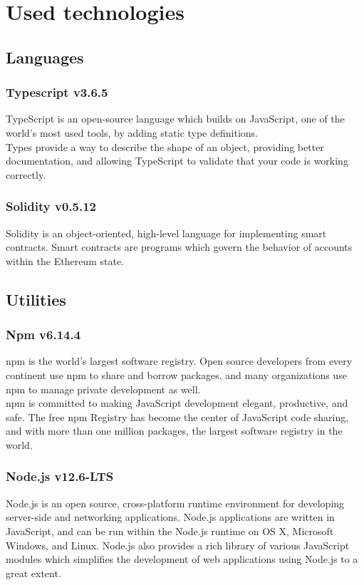 \section{Used technologies}

\subsection{Languages}
\subsubsection*{Typescript v3.6.5}
TypeScript is an open-source language which builds on JavaScript, one of the world’s most used tools, by adding static type definitions.\\
Types provide a way to describe the shape of an object, providing better documentation, and allowing TypeScript to validate that your code is working correctly.

\subsubsection*{Solidity v0.5.12}
Solidity is an object-oriented, high-level language for implementing smart contracts.
Smart contracts are programs which govern the behavior of accounts within the Ethereum state.

\subsection{Utilities}

\subsubsection*{Npm v6.14.4}
npm is the world’s largest software registry. Open source developers from every continent use npm to share and borrow packages, and many organizations use npm to manage private development as well.\\
npm is committed to making JavaScript development elegant, productive, and safe. The free npm Registry has become the center of JavaScript code sharing, and with more than one million packages, the largest software registry in the world. 

\subsubsection*{Node.js v12.6-LTS}
Node.js is an open source, cross-platform runtime environment for developing server-side and networking applications. 
Node.js applications are written in JavaScript, and can be run within the Node.js runtime on OS X, Microsoft Windows, and Linux.
Node.js also provides a rich library of various JavaScript modules which simplifies the development of web applications using Node.js to a great extent.

